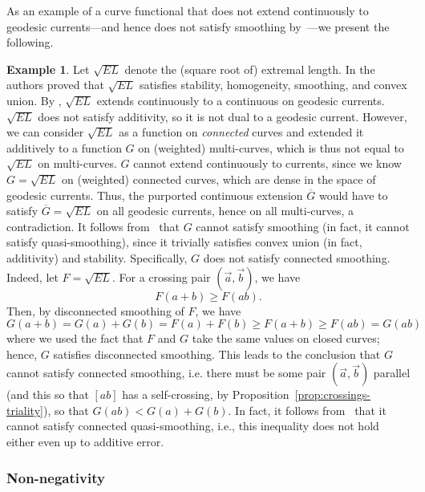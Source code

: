 \documentclass[11pt]{amsart}
\newcommand{\ora}[1]{\overrightarrow{#1}}
\numberwithin{equation}{section}
\numberwithin{figure}{section}
\theoremstyle{definition}
\newtheorem{example}[theorem]{Example}
\theoremstyle{plain}
\begin{document}
As an example of a curve functional that does not extend
continuously to geodesic currents---and hence does not satisfy
smoothing by~\cite[Theorem~A]{MGT21:Smoothings}---we present the following.
\begin{example}\label{ex:linEL}
Let $\sqrt{EL}$ denote the (square root of) extremal length.
In \cite[Section 4.8]{MGT21:Smoothings} the authors proved that $\sqrt{EL}$ satisfies stability, homogeneity, smoothing, and convex union. By  \cite[Theorem~A]{MGT21:Smoothings}, $\sqrt{EL}$ extends continuously to a continuous on geodesic currents.
$\sqrt{EL}$ does not satisfy additivity, so it is not dual to a
geodesic current. However, we can consider $\sqrt{EL}$ as a function
on \emph{connected} curves and extended it additively to a function
$G$ on (weighted)
multi-curves,
which is thus not equal to $\sqrt{EL}$ on multi-curves. $G$ cannot extend continuously to currents, since we know $G=\sqrt{EL}$ on (weighted) connected curves, which are dense in the space of geodesic currents.
Thus, the purported continuous extension $\overline{G}$ would have to satisfy $\overline{G}=\sqrt{EL}$ on all geodesic currents, hence on all multi-curves, a contradiction.
It follows from~\cite[Theorem~A]{MGT21:Smoothings} that $G$ cannot satisfy smoothing (in fact, it cannot satisfy quasi-smoothing), since it trivially satisfies convex union (in fact, additivity) and stability.
Specifically, $G$ does not satisfy connected smoothing.
Indeed, let $F=\sqrt{EL}$. For a crossing pair $(\ora{a},\ora{b})$, we have
\[
F(a + b) \geq F(ab).
\] 
Then, by disconnected smoothing of $F$, we have
\[
G(a+b)=G(a) + G(b)=F(a) + F(b) \geq F(a+b) \geq F(ab)=G(ab)
\]
where we used the fact that $F$ and $G$ take the same values on closed curves; hence,
$G$ satisfies disconnected smoothing.
This leads to the conclusion that $G$ cannot satisfy connected smoothing, i.e. there must be some pair $(\ora{a},\ora{b})$ parallel (and this so that $[ab]$ has a
  self-crossing, by Proposition~\ref{prop:crossings-triality}), so that
  $G(ab) < G(a) + G(b)$. In fact, it follows from~\cite[Theorem~A]{MGT21:Smoothings} that it cannot satisfy connected quasi-smoothing, i.e., this inequality does not hold either even up to additive error.
\end{example}



\subsubsection{Non-negativity}
\end{document}

